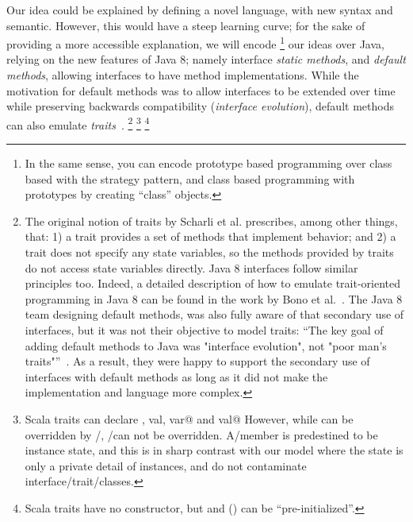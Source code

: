 Our idea could be explained by defining a novel language, with new syntax and semantic.
However, this would have a
steep learning curve; for the sake of providing a more accessible explanation, we will encode
\footnote{
In the same sense, you can encode prototype based programming over class based with
the strategy pattern, and class based programming with prototypes by creating ``class'' objects.
} our ideas
over Java, relying on the new features of Java 8; namely
interface \emph{static methods}, and \emph{default methods}, allowing interfaces to have
method implementations. While the motivation for default methods was
to allow interfaces to be extended over time while preserving backwards
compatibility (\emph{interface evolution}),
 default methods can also emulate \emph{traits}~\cite{scharli03traits}.
\footnote{The
original notion of traits by Scharli et al. prescribes, among other
things, that: 1) a trait provides a set of methods that implement
behavior; and 2) a trait does not specify any state variables, so the
methods provided by traits do not access state variables
directly. Java 8 interfaces follow similar principles too. Indeed, a
detailed description of how to emulate trait-oriented programming in
Java 8 can be found in the work by Bono et al.~\cite{bono14}. The Java 8
team designing default methods, was also fully aware of that secondary
use of interfaces, but it was not their objective to model traits:
``The key goal of adding default methods to Java was "interface
evolution", not "poor man's traits"''~\cite{goetz13default}. As a result, 
they were happy to support the secondary use of interfaces with
default methods as long as it did not make the implementation and
language more complex.}
\footnote{
Scala traits can declare \Q@def, val, var@ and \Q@lazy val@ 
However, while \Q@def@s can be overridden by \Q@val@/\Q@var@s, 
\Q@val@/\Q@var@s can not be overridden.
A\Q@val@/\Q@var@ member is predestined to be instance state, and this
is in sharp contrast with our model where the state is only a private detail of instances, and
do not contaminate interface/trait/classes.}
\footnote{Scala traits have no constructor, but 
\Q@var@s and (\Q@lazy@) \Q@val@s can be ``pre-initialized''.}





